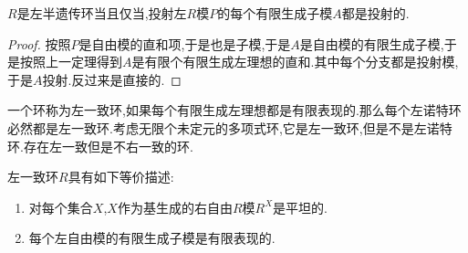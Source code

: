 $R$是左半遗传环当且仅当,投射左$R$模$P$的每个有限生成子模$A$都是投射的.
\begin{proof}
	
	按照$P$是自由模的直和项,于是也是子模,于是$A$是自由模的有限生成子模,于是按照上一定理得到$A$是有限个有限生成左理想的直和.其中每个分支都是投射模,于是$A$投射.反过来是直接的.
\end{proof}

一个环称为左一致环,如果每个有限生成左理想都是有限表现的.那么每个左诺特环必然都是左一致环.考虑无限个未定元的多项式环,它是左一致环,但是不是左诺特环.存在左一致但是不右一致的环.

左一致环$R$具有如下等价描述:
\begin{enumerate}
	\item 对每个集合$X$,$X$作为基生成的右自由$R$模$R^X$是平坦的.
	\item 每个左自由模的有限生成子模是有限表现的.
\end{enumerate}